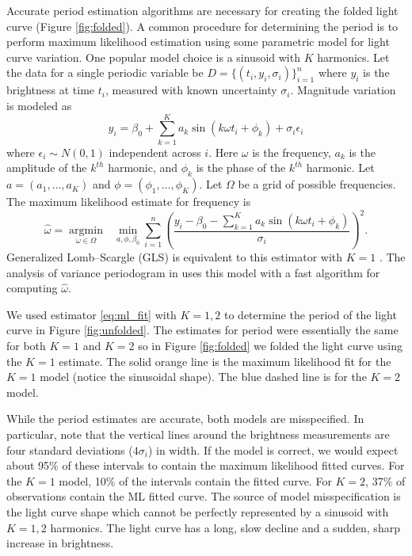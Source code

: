 \documentclass[ejs,ps,preprint]{imsart}
\numberwithin{equation}{section}
\theoremstyle{plain}
\newcommand{\V}[1]{#1} %
\newcommand{\argmin}[1]{\underset{#1}{\operatorname{argmin}}\text{ }}
\begin{document}
Accurate period estimation algorithms are necessary for creating the folded light curve (Figure \ref{fig:folded}). A common procedure for determining the period is to perform maximum likelihood estimation using some parametric model for light curve variation. One popular model choice is a sinusoid with $K$ harmonics. Let the data for a single periodic variable be $D = \{(t_{i},y_{i},\sigma_{i})\}_{i=1}^{n}$ where $y_{i}$ is the brightness at time $t_{i}$, measured with known uncertainty $\sigma_{i}$. Magnitude variation is modeled as
\begin{equation}
\label{eq:model}
y_{i} = \beta_{0} + \sum_{k=1}^K a_{k} \sin(k\omega t_{i} + \phi_{k}) + \sigma_i\epsilon_{i}
\end{equation}
where $\epsilon_{i} \sim N(0,1)$ independent across $i$. Here $\omega$ is the frequency, $a_k$ is the amplitude of the $k^{th}$ harmonic, and $\phi_k$ is the phase of the $k^{th}$ harmonic. Let $a=(a_1,\ldots,a_K)$ and $\phi = (\phi_1,\ldots,\phi_K)$. Let $\Omega$ be a grid of possible frequencies. The maximum likelihood estimate for frequency is
\begin{equation}
\label{eq:ml_fit}
\widehat{\omega} = \argmin{\omega \in \Omega} \min_{\V{a},\V{\phi},\beta_0} \sum_{i=1}^{n} \left(\frac{y_{i} - \beta_{0} - \sum_{k=1}^K a_{k} \sin(k\omega t_{i} + \phi_{k})}{\sigma_{i}}\right)^2.
\end{equation}
Generalized Lomb--Scargle (GLS) is equivalent to this estimator with $K=1$ \cite{zechmeister2009generalised}. The analysis of variance periodogram in \cite{schwarzenberg1996fast} uses this model with a fast algorithm for computing $\widehat{\omega}$.

We used estimator \eqref{eq:ml_fit} with $K=1,2$ to determine the period of the light curve in Figure \ref{fig:unfolded}. The estimates for period were essentially the same for both $K=1$ and $K=2$ so in Figure \ref{fig:folded} we folded the light curve using the $K=1$ estimate. The solid orange line is the maximum likelihood fit for the $K=1$ model (notice the sinusoidal shape). The blue dashed line is for the $K=2$ model.

While the period estimates are accurate, both models are misspecified. In particular, note that the vertical lines around the brightness measurements are four standard deviations ($4\sigma_{i}$) in width. If the model is correct, we would expect about 95\% of these intervals to contain the maximum likelihood fitted curves. For the $K=1$ model, 10\% of the intervals contain the fitted curve. For $K=2$, 37\% of observations contain the ML fitted curve. The source of model misspecification is the light curve shape which cannot be perfectly represented by a sinusoid with $K=1,2$ harmonics. The light curve has a long, slow decline and a sudden, sharp increase in brightness.
\end{document}
